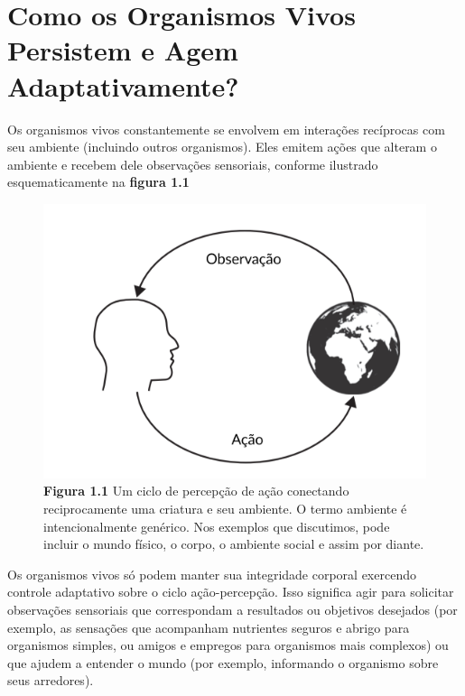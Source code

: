 \documentclass[
  12pt,
]{book}
\begin{document}
\hypertarget{como-os-organismos-vivos-persistem-e-agem-adaptativamente}{%
\section{Como os Organismos Vivos Persistem e Agem Adaptativamente?}\label{como-os-organismos-vivos-persistem-e-agem-adaptativamente}}

Os organismos vivos constantemente se envolvem em interações recíprocas com seu ambiente (incluindo outros organismos). Eles emitem ações que alteram o ambiente e recebem dele observações sensoriais, conforme ilustrado esquematicamente na \textbf{figura 1.1}

\begin{figure}
\centering
\includegraphics{images/Figura_1_1.png}
\caption{\textbf{Figura 1.1} Um ciclo de percepção de ação conectando reciprocamente uma criatura e seu ambiente. O termo ambiente é intencionalmente genérico. Nos exemplos que discutimos, pode incluir o mundo físico, o corpo, o ambiente social e assim por diante.}
\end{figure}

Os organismos vivos só podem manter sua integridade corporal exercendo controle adaptativo sobre o ciclo ação-percepção. Isso significa agir para solicitar observações sensoriais que correspondam a resultados ou objetivos desejados (por exemplo, as sensações que acompanham nutrientes seguros e abrigo para organismos simples, ou amigos e empregos para organismos mais complexos) ou que ajudem a entender o mundo (por exemplo, informando o organismo sobre seus arredores).
\end{document}
